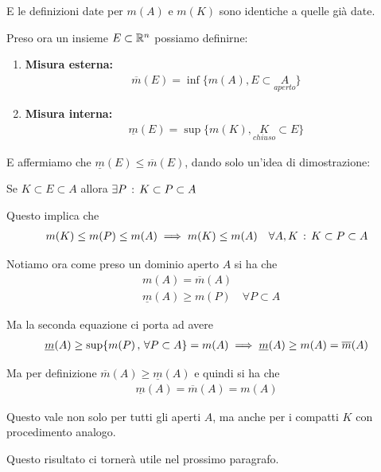 E le definizioni date per $m(A)$ e $m(K)$ sono identiche a quelle già date.

\newpage

Preso ora un insieme $E \subset \mathbb{R}^n$ possiamo definirne:
\begin{enumerate}
	\item \textbf{Misura esterna:}
	\begin{align}
		\overline{m}(E) = \inf\{m(A), E\subset\underset{aperto}{A}\}
	\end{align} 
	\item \textbf{Misura interna:}
	\begin{align}
		\underline{m}(E) = \sup\{m(K), \underset{chiuso}{K}\subset E\}
	\end{align} 
\end{enumerate}

E affermiamo che $\underline{m}(E) \leq \overline{m}(E)$, dando solo un'idea di dimostrazione:

\bigskip

Se $K \subset E \subset A$ allora $\exists P \, : \, K \subset P \subset A$

\bigskip

Questo implica che 
\begin{align}
	m(K)\leq m(P) \leq m(A) \implies m(K)\leq m(A) \quad \forall A,K \, : \, K \subset P \subset A
\end{align}

\bigskip

Notiamo ora come preso un dominio aperto $A$ si ha che 
\begin{align}
	{}&m(A)=\overline{m}(A)\\
	&\underline{m}(A)\geq m(P) \quad \forall P \subset A
\end{align}

Ma la seconda equazione ci porta ad avere
\begin{align}
	\underline{m}(A) \geq \sup \{ m(P) \, , \, \forall P \subset A \} = m(A) \implies \underline{m}(A)\geq m(A)=\overline{m}(A)
\end{align}

Ma per definizione $\overline{m}(A)\geq \underline{m}(A)$ e quindi si ha che
\begin{align}
	\underline{m}(A) =\overline{m}(A) = m(A)
\end{align}

Questo vale non solo per tutti gli aperti $A$, ma anche per i compatti $K$ con procedimento analogo. 

Questo risultato ci tornerà utile nel prossimo paragrafo.

